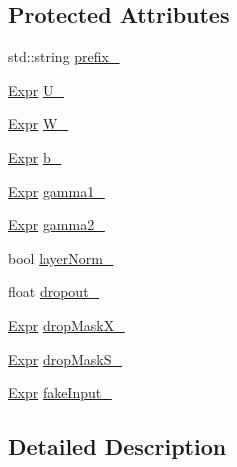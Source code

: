 \subsection*{Protected Attributes}
\begin{DoxyCompactItemize}
\item 
std\+::string \hyperlink{classmarian_1_1rnn_1_1FastLSTM_ae6f3dc1b6b63ffb7ae68eafdf98ca5de}{prefix\+\_\+}
\item 
\hyperlink{namespacemarian_a498d8baf75b754011078b890b39c8e12}{Expr} \hyperlink{classmarian_1_1rnn_1_1FastLSTM_a94423205eb1b2cedf8a1c9e48f5b9c0e}{U\+\_\+}
\item 
\hyperlink{namespacemarian_a498d8baf75b754011078b890b39c8e12}{Expr} \hyperlink{classmarian_1_1rnn_1_1FastLSTM_ad0953564d51fae532551b75bc51cfe0d}{W\+\_\+}
\item 
\hyperlink{namespacemarian_a498d8baf75b754011078b890b39c8e12}{Expr} \hyperlink{classmarian_1_1rnn_1_1FastLSTM_a4b637d17c49e8d687f1a4b3747d0e191}{b\+\_\+}
\item 
\hyperlink{namespacemarian_a498d8baf75b754011078b890b39c8e12}{Expr} \hyperlink{classmarian_1_1rnn_1_1FastLSTM_a3b3ec7656304f6bb651a7d178eafc515}{gamma1\+\_\+}
\item 
\hyperlink{namespacemarian_a498d8baf75b754011078b890b39c8e12}{Expr} \hyperlink{classmarian_1_1rnn_1_1FastLSTM_abbe09f956268903da106fb93de6a9ae5}{gamma2\+\_\+}
\item 
bool \hyperlink{classmarian_1_1rnn_1_1FastLSTM_a2f5806e02a37ee6b63330ac6b4c6dc7e}{layer\+Norm\+\_\+}
\item 
float \hyperlink{classmarian_1_1rnn_1_1FastLSTM_a12a295492bb6fdd495109988a17c6996}{dropout\+\_\+}
\item 
\hyperlink{namespacemarian_a498d8baf75b754011078b890b39c8e12}{Expr} \hyperlink{classmarian_1_1rnn_1_1FastLSTM_a0f85818d69d5fc264723e09568bf83a4}{drop\+Mask\+X\+\_\+}
\item 
\hyperlink{namespacemarian_a498d8baf75b754011078b890b39c8e12}{Expr} \hyperlink{classmarian_1_1rnn_1_1FastLSTM_adbc5704ab5b1cc30e29861e9653bd0a3}{drop\+Mask\+S\+\_\+}
\item 
\hyperlink{namespacemarian_a498d8baf75b754011078b890b39c8e12}{Expr} \hyperlink{classmarian_1_1rnn_1_1FastLSTM_a916ee398d376247b5cd44f346d19d449}{fake\+Input\+\_\+}
\end{DoxyCompactItemize}


\subsection{Detailed Description}


